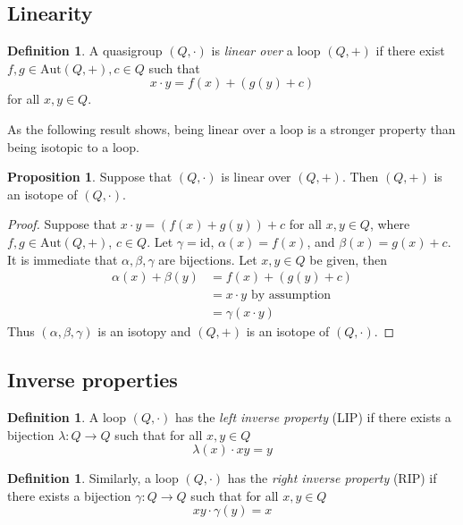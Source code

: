 \documentclass[12pt]{report}
\theoremstyle{definition}
\newtheorem{prp}[thm]{Proposition}
\newtheorem{dfn}[thm]{Definition}
\newcommand{\aut}{\mathrm{Aut}}     %
\newcommand{\id}{\mathrm{id}}       %
\begin{document}
\subsection{Linearity}

\begin{dfn}
  A quasigroup $(Q, \cdot)$ is \emph{linear over} a loop $(Q, +)$ if there exist $f, g\in \aut(Q, +), c\in Q$ such that
  \[x\cdot y = f(x) + (g(y) + c)\]
  for all $x, y\in Q$.
\end{dfn}

As the following result shows, being linear over a loop is a stronger property than being isotopic to a loop.

\begin{prp}\label{prp-linear-iso}
  Suppose that $(Q, \cdot)$ is linear over $(Q, +)$. Then $(Q, +)$ is an isotope of $(Q, \cdot)$.
\end{prp}

\begin{proof}
  Suppose that $x\cdot y = (f(x) + g(y)) + c$ for all $x, y\in Q$, where $f, g\in \aut(Q, +)$, $c\in Q$. Let $\gamma = \id$,
    $\alpha(x) = f(x)$, and $\beta(x) = g(x) + c$. It is immediate that $\alpha, \beta, \gamma$ are bijections.
    Let $x, y\in Q$ be given, then
  \begin{align*}
    \alpha(x) + \beta(y) &= f(x) + (g(y) + c)\\
    &= x\cdot y\text{ by assumption}\\
    &= \gamma(x\cdot y)
  \end{align*}
  Thus $(\alpha, \beta, \gamma)$ is an isotopy and $(Q, +)$ is an isotope of $(Q, \cdot)$.
\end{proof}

\subsection{Inverse properties}

\begin{dfn}
  A loop $(Q, \cdot)$ has the \emph{left inverse property} (LIP) if there exists a bijection $\lambda: Q\to Q$ such
    that for all $x, y\in Q$
  \[\lambda(x)\cdot xy = y\]
\end{dfn}

\begin{dfn}
  Similarly, a loop $(Q, \cdot)$ has the \emph{right inverse property} (RIP) if there exists a bijection $\gamma: Q\to Q$
    such that for all $x, y\in Q$
  \[xy\cdot \gamma(y) = x\]
\end{dfn}
\end{document}
